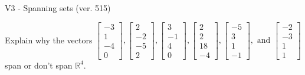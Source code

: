 \begin{exercise}
  \begin{exerciseTitle}V3 - Spanning sets (ver. 515)\end{exerciseTitle}
  \begin{exerciseStatement}
    Explain why the vectors \(\left[\begin{array}{r}
-3 \\
1 \\
-4 \\
0
\end{array}\right] , \left[\begin{array}{r}
2 \\
-2 \\
-5 \\
2
\end{array}\right] , \left[\begin{array}{r}
3 \\
-1 \\
4 \\
0
\end{array}\right] , \left[\begin{array}{r}
2 \\
2 \\
18 \\
-4
\end{array}\right] , \left[\begin{array}{r}
-5 \\
3 \\
1 \\
-1
\end{array}\right] , \text{ and } \left[\begin{array}{r}
-2 \\
-3 \\
1 \\
1
\end{array}\right]\) span or don't span \(\mathbb{R}^4\). 
	



\end{exerciseStatement}
\end{exercise}
